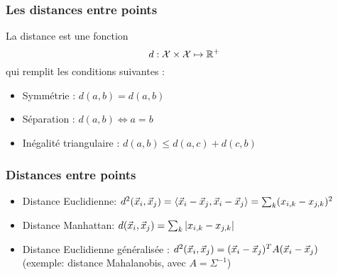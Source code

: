\begin{frame}
\frametitle{Les distances entre points}
La distance est une fonction 
\begin{equation*}
d: \mathcal{X} \times \mathcal{X} \mapsto {\mathbb R}^{+} 
\end{equation*}
qui remplit les conditions suivantes : 
\begin{itemize}
\item Symmétrie : $d(a, b) = d(a, b)$
\item Séparation : $d(a, b) \Leftrightarrow a=b$
\item Inégalité triangulaire : $d(a,b) \leq d(a,c) + d(c,b)$
\end{itemize}
\end{frame}

\begin{frame}
\frametitle{Distances entre points}
\begin{itemize}
\item Distance Euclidienne: $d^2(\vec{x}_i, \vec{x}_j) = \langle \vec{x}_i-\vec{x}_j, \vec{x}_i-\vec{x}_j \rangle = \sum_k(x_{i,k}-x_{j,k})^2$
\item Distance Manhattan: $d(\vec{x}_i, \vec{x}_j) = \sum_k|x_{i,k}-x_{j,k}|$
\item Distance Euclidienne généralisée : $d^2(\vec{x}_i, \vec{x}_j) = (\vec{x}_i - \vec{x}_j)^TA(\vec{x}_i - \vec{x}_j)$ (exemple: distance Mahalanobis, avec $A=\Sigma^{-1}$)
\end{itemize}
\end{frame}




